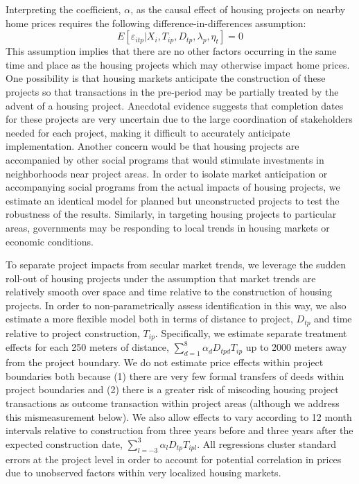 \documentclass[12pt]{article}
\begin{document}
Interpreting the coefficient, $\alpha$, as the causal effect of housing projects on nearby home prices requires the following difference-in-differences assumption:
\begin{equation*}
E[\varepsilon_{itp}|X_{i},T_{ip},D_{tp},\lambda_p,\eta_{t}]=0
\end{equation*}
This assumption implies that there are no other factors occurring in the same time and place as the housing projects which may otherwise impact home prices.  One possibility is that housing markets anticipate the construction of these projects so that transactions in the pre-period may be partially treated by the advent of a housing project.  Anecdotal evidence suggests that completion dates for these projects are very uncertain due to the large coordination of stakeholders needed for each project, making it difficult to accurately anticipate implementation.  Another concern would be that housing projects are accompanied by other social programs that would stimulate investments in neighborhoods near project areas.  In order to isolate market anticipation or accompanying social programs from the actual impacts of housing projects, we estimate an identical model for planned but unconstructed projects to test the robustness of the results.  Similarly, in targeting housing projects to particular areas, governments may be responding to local trends in housing markets or economic conditions.  

To separate project impacts from secular market trends, we leverage the sudden roll-out of housing projects under the assumption that market trends are relatively smooth over space and time relative to the construction of housing projects.  In order to non-parametrically assess identification in this way, we also estimate a more flexible model both in terms of distance to project, $D_{tp}$ and time relative to project construction, $T_{ip}$.  Specifically, we estimate separate treatment effects for each 250 meters of distance, $\sum_{d=1}^{8} \alpha_d D_{tpd} T_{ip}$ up to 2000 meters away from the project boundary.  We do not estimate price effects within project boundaries both because (1) there are very few formal transfers of deeds within project boundaries and (2) there is a greater risk of miscoding housing project transactions as outcome transaction within project areas (although we address this mismeasurement below).  We also allow effects to vary according to 12 month intervals relative to construction from three years before and three years after the expected construction date, $\sum_{l=-3}^{3} \alpha_l D_{tp}T_{ipl}$.  All regressions cluster standard errors at the project level in order to account for potential correlation in prices due to unobserved factors within very localized housing markets.  
\end{document}
